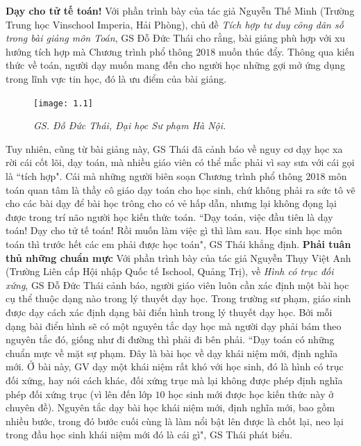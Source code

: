 \begin{multicols}{2}
	\vskip 0.1cm
	\textbf{\color{diendantoanhoc}Dạy cho tử tế toán!}
	\vskip 0.1cm
	Với phần trình bày của tác giả Nguyễn Thế Minh (Trường Trung học Vinschool Imperia, Hải Phòng), chủ đề \textit{Tích hợp tư duy công dân số trong bài giảng môn Toán}, GS Đỗ Đức Thái cho rằng, bài giảng phù hợp với xu hướng tích hợp mà Chương trình phổ thông $2018$ muốn thúc đẩy. Thông qua kiến thức về toán, người dạy muốn mang đến cho người học những gợi mở ứng dụng trong lĩnh vực tin học, đó là ưu điểm của bài giảng. 
	\begin{figure}[H]
		\vspace*{-5pt}
		\centering
		\captionsetup{labelformat= empty, justification=centering}
		\texttt{[image: 1.1]}
		\caption{\small\textit{\color{diendantoanhoc}GS. Đỗ Đức Thái, Đại học Sư phạm Hà Nội.}}
		\vspace*{-10pt}
	\end{figure}
	Tuy nhiên, cũng từ bài giảng này, GS Thái đã cảnh báo về nguy cơ dạy học xa rời cái cốt lõi, dạy toán, mà nhiều giáo viên có thể mắc phải vì say sưa với cái gọi là ``tích hợp". Cái mà những người biên soạn Chương trình phổ thông $2018$ môn toán quan tâm là thầy cô giáo dạy toán cho học sinh, chứ không phải ra sức tô vẽ cho các bài dạy để bài học trông cho có vẻ hấp dẫn, nhưng lại không đọng lại được trong trí não người học kiến thức toán. ``Dạy toán, việc đầu tiên là dạy toán! Dạy cho tử tế toán! Rồi muốn làm việc gì thì làm sau. Học sinh học môn toán thì trước hết các em phải được học toán", GS Thái khẳng định. 
	\vskip 0.1cm
	\textbf{\color{diendantoanhoc}Phải tuân thủ những chuẩn mực} 
	\vskip 0.1cm
	Với phần trình bày của tác giả Nguyễn Thụy Việt Anh (Trường Liên cấp Hội nhập Quốc tế Ischool, Quảng Trị), về \textit{Hình có trục đối xứng}, GS Đỗ Đức Thái cảnh báo, người giáo viên luôn cần xác định một bài học cụ thể thuộc dạng nào trong lý thuyết dạy học. Trong trường sư phạm, giáo sinh được dạy cách xác định dạng bài điển hình trong lý thuyết dạy học. Bởi mỗi dạng bài điển hình sẽ có một nguyên tắc dạy học mà người dạy phải bám theo nguyên tắc đó, giống như đi đường thì phải đi bên phải.  
	\vskip 0.1cm
	``Dạy toán có những chuẩn mực về mặt sự phạm. Đây là bài học về dạy khái niệm mới, định nghĩa mới. Ở bài này, GV dạy một khái niệm rất khó với học sinh, đó là hình có trục đối xứng, hay nói cách khác, đối xứng trục mà lại không được phép định nghĩa phép đối xứng trục (vì lên đến lớp $10$ học sinh mới được học kiến thức này ở chuyên đề). Nguyên tắc dạy bài học khái niệm mới, định nghĩa mới, bao gồm nhiều bước, trong đó bước cuối cùng là làm nổi bật lên được là chốt lại, neo lại trong đầu học sinh khái niệm mới đó là cái gì", GS Thái phát biểu. 

\end{multicols}
